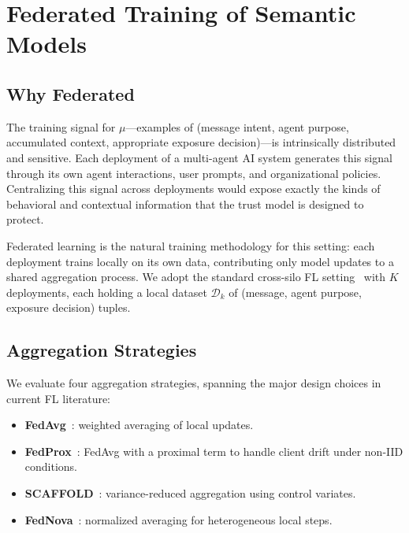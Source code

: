 \documentclass[sigconf,nonacm]{acmart}
\begin{document}
\section{Federated Training of Semantic Models}
\label{sec:fl}


\subsection{Why Federated}

The training signal for $\mu$---examples of (message intent, agent purpose, accumulated context, appropriate exposure decision)---is intrinsically distributed and sensitive. Each deployment of a multi-agent AI system generates this signal through its own agent interactions, user prompts, and organizational policies. Centralizing this signal across deployments would expose exactly the kinds of behavioral and contextual information that the trust model is designed to protect.

Federated learning is the natural training methodology for this setting: each deployment trains locally on its own data, contributing only model updates to a shared aggregation process. We adopt the standard cross-silo FL setting~\cite{REF:fl-survey} with $K$ deployments, each holding a local dataset $\mathcal{D}_k$ of (message, agent purpose, exposure decision) tuples.

\subsection{Aggregation Strategies}

We evaluate four aggregation strategies, spanning the major design choices in current FL literature:
\begin{itemize}
    \item \textbf{FedAvg}~\cite{REF:fedavg}: weighted averaging of local updates.
    \item \textbf{FedProx}~\cite{REF:fedprox}: FedAvg with a proximal term to handle client drift under non-IID conditions.
    \item \textbf{SCAFFOLD}~\cite{REF:scaffold}: variance-reduced aggregation using control variates.
    \item \textbf{FedNova}~\cite{REF:fednova}: normalized averaging for heterogeneous local steps.
\end{itemize}
\end{document}
